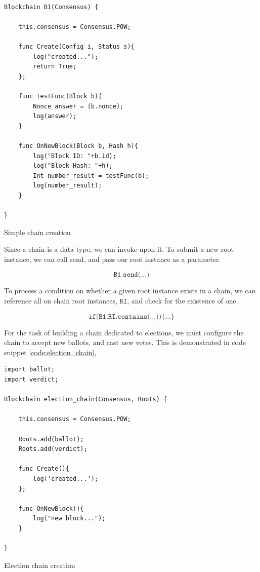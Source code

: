 \documentclass[12pt, titlepage, twocolumn]{report}
\begin{document}
\begin{listing}[ht]
\begin{minipage}{\linewidth}
\begin{lstlisting}

Blockchain B1(Consensus) {

	this.consensus = Consensus.POW;

	func Create(Config i, Status s){ 
		log("created..."); 
		return True; 
	}; 

	func testFunc(Block b){
		Nonce answer = (b.nonce);
		log(answer);
	}

	func OnNewBlock(Block b, Hash h){
		log("Block ID: "+b.id);
		log("Block Hash: "+h);
		Int number_result = testFunc(b);
		log(number_result);
	}

}
\end{lstlisting}
\end{minipage}
\caption{Simple chain creation}
\label{code:simple}
\end{listing}

Since a chain is a data type, we can invoke upon it. To submit a new root instance, we can call send, and pass our root instance as a parameter.

\begin{equation}
\texttt{B1.send(\ldots)}
\end{equation}

To process a condition on whether a given root instance exists in a chain, we can reference all on chain root instances, \(\texttt{RI}\), and check for the existence of one.

\begin{equation}
\texttt{if(B1.RI.contains(\ldots))\{\ldots\}}
\end{equation}

For the task of building a chain dedicated to elections, we must configure the chain to accept new ballots, and cast new votes. This is demonstrated in code snippet \ref{code:election_chain},

\begin{listing}[ht]
\begin{minipage}{\linewidth}
\begin{lstlisting}
import ballot;
import verdict;

Blockchain election_chain(Consensus, Roots) { 

    this.consensus = Consensus.POW;

    Roots.add(ballot);
    Roots.add(verdict);
	
    func Create(){ 
        log('created...'); 
    }; 

    func OnNewBlock(){
        log("new block...");
    }

}
\end{lstlisting}
\end{minipage}
\caption{Election chain creation}
\label{code:election_chain}
\end{listing}
\end{document}
